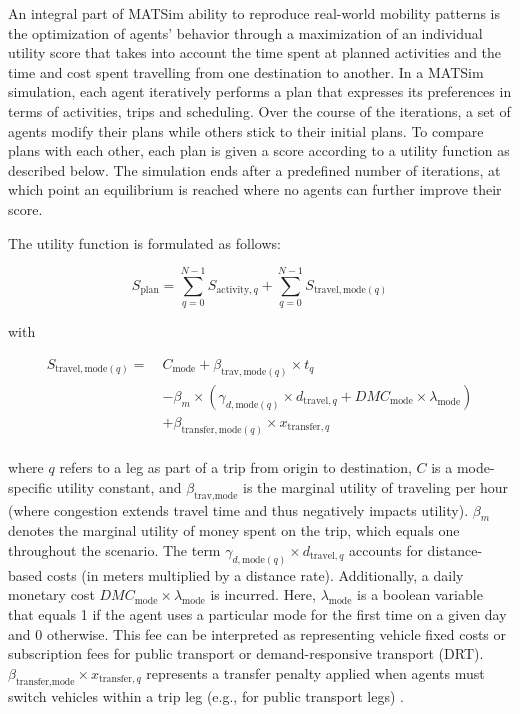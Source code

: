 \documentclass[main.tex]{subfiles}
\begin{document}
An integral part of MATSim ability to reproduce real-world mobility patterns is the optimization of agents' behavior through a maximization of an individual utility score that takes into account the time spent at planned activities and the time and cost spent travelling from one destination to another. In a MATSim simulation, each agent iteratively performs a plan that expresses its preferences in terms of activities, trips and scheduling. Over the course of the iterations, a set of agents modify their plans while others stick to their initial plans. To compare plans with each other, each plan is given a score according to a utility function as described below. The simulation ends after a predefined number of iterations, at which point an equilibrium is reached where no agents can further improve their score.  

The utility function is formulated as follows: 

\begin{equation}
S_{\text{plan}} = \sum_{q=0}^{N-1} S_{\text{activity},q} + \sum_{q=0}^{N-1} S_{\text{travel},\text{mode}(q)}
\label{1}
\end{equation}

with

\begin{equation}
\begin{aligned}
S_{\text{travel},\text{mode}(q)} =\ & C_{\text{mode}} + \beta_{\text{trav},\text{mode}(q)} \times t_{q} \\
& - \beta_{m} \times \left( \gamma_{d,\text{mode}(q)} \times d_{\text{travel},q} + DMC_{\text{mode}} \times \lambda_{\text{mode}} \right) \\
& + \beta_{\text{transfer},\text{mode}(q)} \times x_{\text{transfer},q}
\end{aligned}
\end{equation} 
\\

where $q$ refers to a leg as part of a trip from origin to destination, $C$ is a mode-specific utility constant, and $\beta_{\text{trav},\text{mode}}$ is the marginal utility of traveling per hour (where congestion extends travel time and thus negatively impacts utility). $\beta_{m}$ denotes the marginal utility of money spent on the trip, which equals one throughout the scenario. The term $\gamma_{d,\text{mode}(q)} \times d_{\text{travel},q}$ accounts for distance-based costs (in meters multiplied by a distance rate). Additionally, a daily monetary cost $DMC_{\text{mode}} \times \lambda_{\text{mode}}$ is incurred. Here, $\lambda_{\text{mode}}$ is a boolean variable that equals 1 if the agent uses a particular mode for the first time on a given day and 0 otherwise. This fee can be interpreted as representing vehicle fixed costs or subscription fees for public transport or demand-responsive transport (DRT).  $\beta_{\text{transfer},\text{mode}} \times x_{\text{transfer},q}$ represents a transfer penalty applied when agents must switch vehicles within a trip leg (e.g., for public transport legs) \citep{Horni.2016}. 
\end{document}
